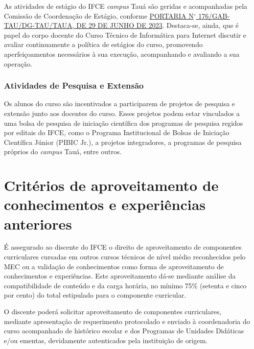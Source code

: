 \documentclass[
	12pt,				%
	openright,			%
	twoside,			%
	a4paper,			%
	chapter=TITLE,		%
	english,			%
	french,				%
	spanish,			%
	brazil,				%
	]{abntex2}
\newcommand{\nord}[1]{N$^\circ$ #1}
\begin{document}
As atividades de estágio do IFCE \textit{campus} Tauá são geridas e acompanhadas pela Comissão de Coordenação de Estágio, conforme  \href{https://sei.ifce.edu.br/sei/controlador_externo.php?acao=documento_conferir&codigo_verificador=5049721&codigo_crc=D2A855C5&hash_download=8211d5eecb230cb8765ceb54199b56b9dcf61d684050d5c575df55732d493c4e40f77568847d43c092af63a30df085c55666384493a581b4cc78038b5247d885&visualizacao=1&id_orgao_acesso_externo=0}{PORTARIA \nord{176}/GAB-TAU/DG-TAU/TAUA, DE 29 DE JUNHO DE 2023}. Destaca-se, ainda, que é papel do corpo docente do Curso Técnico de Informática para Internet discutir e avaliar continuamente a política de estágios do curso, promovendo aperfeiçoamentos necessários à sua execução, acompanhando e avaliando a sua operação.


\subsection{Atividades de Pesquisa e Extensão}
Os alunos do curso são incentivados a participarem de projetos de pesquisa e extensão junto aos docentes do curso. Esses projetos podem estar vinculados a uma bolsa de pesquisa de iniciação científica dos programas de pesquisa regidos por editais do IFCE, como o  Programa Institucional de Bolsas de Iniciação Científica Júnior (PIBIC Jr.), a projetos integradores, a programas de pesquisa próprios do \textit{campus} Tauá, entre outros. 


\chapter{Critérios de aproveitamento de conhecimentos e experiências anteriores}


É assegurado ao discente do IFCE o direito de aproveitamento de componentes curriculares cursadas em outros cursos técnicos de nível médio reconhecidos pelo MEC ou a validação de conhecimentos como forma de aproveitamento de conhecimentos e experiências. Este aproveitamento dá-se mediante análise da compatibilidade de conteúdo e da carga horária, no mínimo 75\% (setenta e cinco por cento) do total estipulado para o componente curricular.

O discente poderá solicitar aproveitamento de componentes curriculares, mediante apresentação de requerimento protocolado e enviado à coordenadoria do curso acompanhado de histórico escolar e dos Programas de Unidades Didáticas e/ou ementas, devidamente autenticados pela instituição de origem.
\end{document}
